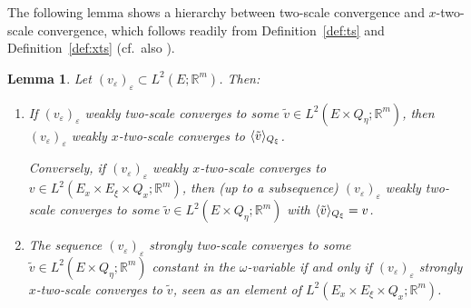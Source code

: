 \documentclass[reqno,11pt]{amsart}
\numberwithin{equation}{section}
\theoremstyle{thmlemcorr}
\numberwithin{theorem}{section}
\newtheorem{lemma}[theorem]{Lemma}
\theoremstyle{thmlemcorr*}
\theoremstyle{defi}
\theoremstyle{remexample}
\theoremstyle{ass}
\newcommand{\R}{\mathbb{R}}
\renewcommand{\epsilon}{\varepsilon}
\DeclarePairedDelimiter{\inner}{\langle}{\rangle}
\newcommand{\1}{\mathds{1}}
\newcommand{\veps}{\varepsilon}
\newcommand{\sequence}[2]{(#1_#2)_{#2}}
\begin{document}
The following lemma shows a hierarchy between two-scale convergence and \(x\)-two-scale convergence, which follows readily from Definition~\ref{def:ts} and Definition~\ref{def:xts} (cf.\ also \cite[Proposition~6.2.5]{Ne10}).
\begin{lemma}\label{lem:ts_and_xts}
Let \(\sequence{v}{\veps}\subset L^2(E;\R^m)\).
Then:
\begin{enumerate}[label=(\roman*)]
        \item\label{it:ts_to_xts}
        If $(v_\epsilon)_{\epsilon}$ weakly two-scale converges to some $\tilde{v}\in L^2(E\times Q_\eta;\R^m)$, then $(v_\epsilon)_\epsilon$ weakly $x$-two-scale converges to $\inner{\tilde{v}}_{Q_\xi}$. \smallskip
        
        \noindent Conversely, if $(v_\epsilon)_\epsilon$ weakly $x$-two-scale converges to $v \in L^2(E_x\times E_\xi \times Q_x;\R^m)$, then (up to a subsequence) $(v_\epsilon)_{\epsilon}$ weakly two-scale converges to some $\tilde{v}\in L^2(E\times Q_\eta;\R^m)$ with $\inner{\tilde{v}}_{Q_\xi}=v$. \smallskip
        
        \item\label{it:xts_to_ts}
        The sequence $(v_\epsilon)_\epsilon$ strongly two-scale converges to some $\tilde{v} \in L^2(E\times Q_\eta;\R^m)$ constant in the $\omega$-variable if and only if $(v_\epsilon)_\epsilon$ strongly $x$-two-scale converges to $\tilde{v}$, seen as an element of $L^2(E_x\times E_\xi \times Q_x;\R^m)$.
    \end{enumerate}
\end{lemma}
\end{document}

